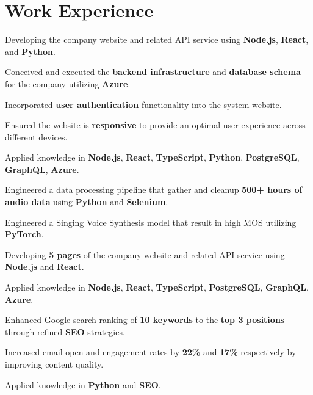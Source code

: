 \documentclass[a4paper,10pt]{article}
\begin{document}
\section{Work Experience}
\dvd{}
\begin{tightitemize}
  \item Developing the company website and related API service using \textbf{Node.js}, \textbf{React}, and \textbf{Python}.
  \item Conceived and executed the \textbf{backend infrastructure} and \textbf{database schema} for the company utilizing \textbf{Azure}.
  \item Incorporated \textbf{user authentication} functionality into the system website.
  \item Ensured the website is \textbf{responsive} to provide an optimal user experience across different devices.
  \item Applied knowledge in \textbf{Node.js}, \textbf{React}, \textbf{TypeScript}, \textbf{Python}, \textbf{PostgreSQL}, \textbf{GraphQL}, \textbf{Azure}.
\end{tightitemize}

\dvd{}
\begin{tightitemize}
  \item Engineered a data processing pipeline that gather and cleanup \textbf{500+ hours of audio data} using \textbf{Python} and \textbf{Selenium}.
  \item Engineered a Singing Voice Synthesis model that result in high MOS utilizing \textbf{PyTorch}.
  \item Developing \textbf{5 pages} of the company website and related API service using \textbf{Node.js} and \textbf{React}.
  \item Applied knowledge in \textbf{Node.js}, \textbf{React}, \textbf{TypeScript}, \textbf{PostgreSQL}, \textbf{GraphQL}, \textbf{Azure}.
\end{tightitemize}

\dvd{}

\begin{tightitemize}
  \item Enhanced Google search ranking of \textbf{10 keywords} to the \textbf{top 3 positions} through refined \textbf{SEO} strategies.
  \item Increased email open and engagement rates by \textbf{22\%} and \textbf{17\%} respectively by improving content quality.
  \item Applied knowledge in \textbf{Python} and \textbf{SEO}.
\end{tightitemize}
\end{document}
